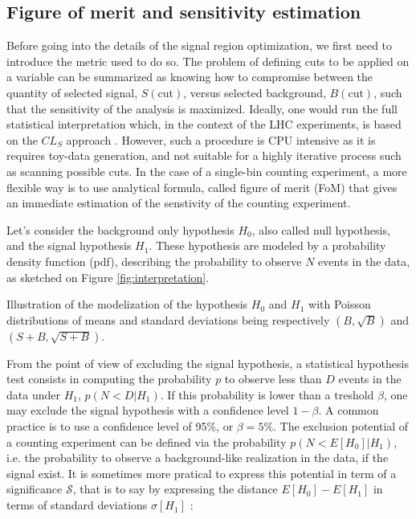             \subsection{Figure of merit and sensitivity estimation}

    Before going into the details of the signal region optimization, we first need to
    introduce the metric used to do so. The problem of defining cuts to be applied on a
    variable can be summarized as knowing how to compromise between the quantity of
    selected signal, $S(\text{cut})$, versus selected background, $B(\text{cut})$, such
    that the sensitivity of the analysis is maximized. Ideally, one would run the full
    statistical interpretation which, in the context of the LHC experiments, is based
    on the $CL_S$ approach . However, such a procedure is CPU intensive as it is
    requires toy-data generation, and not suitable for a highly iterative process such
    as scanning possible cuts. In the case of a single-bin counting experiment, a more
    flexible way is to use analytical formula, called figure of merit (FoM) that gives an
    immediate estimation of the senstivity of the counting experiment.

    Let's consider the background only hypothesis $H_0$, also called null hypothesis,
    and the signal hypothesis $H_1$. These hypothesis are modeled by a probability density
    function (pdf), describing the probability to observe $N$ events in the data, as
    sketched on Figure \ref{fig:interpretation}.

                 {Illustration of the modelization of the hypothesis $H_0$ and $H_1$ with
                 Poisson distributions of means and standard deviations being respectively
                 $(B,\sqrt{B})$ and $(S+B,\sqrt{S+B})$. }

    From the point of view of excluding the signal hypothesis, a statistical hypothesis
    test consists in computing the probability $p$ to observe less than $D$ events in the
    data under $H_1$, $p(N < D|H_1)$. If this probability is lower than a treshold
    $\beta$, one may exclude the signal hypothesis with a confidence level $1-\beta$. A
    common practice is to use a confidence level of 95\%, or $\beta = 5\%$. The exclusion
    potential of a counting experiment can be defined via the probability $p(N < E[H_0]|H_1)$,
    i.e. the probability to observe a background-like realization in the data, if the
    signal exist. It is sometimes more pratical to express this potential in term of a
    significance $\mathcal{S}$, that is to say by expressing the distance $E[H_0] -
    E[H_1]$ in terms of standard deviations $\sigma[H_1]$ :

